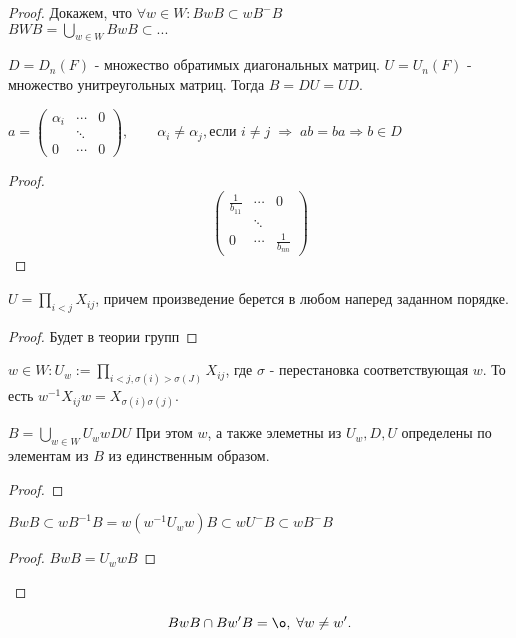 \documentclass[12pt]{report}
\begin{document}
\begin{proof}
    Докажем, что $\forall w \in  W: BwB \subset w B^- B$ \\
    $B W B = \bigcup _{w \in  W} B w B \subset ...$%
    \begin{lm}[1]
	$D = D_n (F)$ - множество обратимых диагональных матриц. $U = U_n(F)$ - множество унитреугольных матриц. Тогда $B = D U = U D$.
    \end{lm}
    \begin{probl}
        $a = \left ( 
        \begin{array}{ccc}
	    \alpha_i & \cdots & 0 \\
	     & \ddots &\\
	    0 & \cdots & 0
        \end{array}
        \right ), \qquad \alpha _i \ne \alpha_j , \mbox{если } i \ne j \; \Rightarrow \; ab = ba \Rightarrow b \in  D$
    \end{probl}
    \begin{proof}
    $$
    \left ( 
    \begin{array}{ccc}
	\frac{1}{b_{11}} & \cdots & 0 \\
	&\ddots & \\
	0 & \cdots & \frac{1}{b_{nn}}
    \end{array}
    \right )
    $$%
    \end{proof}
    \begin{lm}[2]
	$U = \prod_{i < j} X_{ij}$, причем произведение берется в любом наперед заданном порядке.
    \end{lm}
     \begin{proof}
        Будет в теории групп
    \end{proof}
    \begin{name}
	$w \in  W : U_w := \prod_{i < j, \sigma (i) >\sigma(J)} X_{ij}$, где $\sigma$ - перестановка соответствующая $w$.
	То есть $w^{-1} X _{ij} w = X_{\sigma(i) \sigma(j)}$.
    \end{name}
    \begin{thm}
	$B = \bigcup _{w \in  W} U_w w D U$
	При этом $ w$, а также элеметны из $U_w, D, U$ определены по элементам из $B$  из единственным образом.
    \end{thm}
    \begin{proof}
    \end{proof}
    \begin{cor}
	$BwB \subset w B^{-1}B = w (w^{-1} U_w w)B \subset w U^{-} B \subset w B ^{-} B$
    \end{cor}
    \begin{proof}
        $B w B = U_w w B$
    \end{proof}
\end{proof}
\begin{st}
    \[
    B w B \cap B w ' B = \o ,\; \forall w \ne w'
    .\] 
\end{st}
\end{document}
